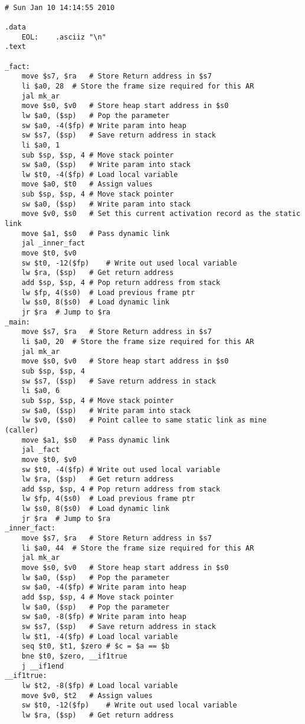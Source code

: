 \begin{lstlisting}[showstringspaces=false,breaklines=true,backgroundcolor=\color{light-gray}, captionpos=b]
         
# Sun Jan 10 14:14:55 2010

.data
	EOL:	.asciiz "\n"
.text

_fact:
	move $s7, $ra	# Store Return address in $s7
	li $a0, 28	# Store the frame size required for this AR
	jal mk_ar
	move $s0, $v0	# Store heap start address in $s0
	lw $a0, ($sp)	# Pop the parameter
	sw $a0, -4($fp)	# Write param into heap
	sw $s7, ($sp)	# Save return address in stack
	li $a0, 1
	sub $sp, $sp, 4	# Move stack pointer
	sw $a0, ($sp)	# Write param into stack
	lw $t0, -4($fp)	# Load local variable
	move $a0, $t0	# Assign values
	sub $sp, $sp, 4	# Move stack pointer
	sw $a0, ($sp)	# Write param into stack
	move $v0, $s0	# Set this current activation record as the static link
	move $a1, $s0	# Pass dynamic link
	jal _inner_fact
	move $t0, $v0
	sw $t0, -12($fp)	# Write out used local variable
	lw $ra, ($sp)	# Get return address
	add $sp, $sp, 4	# Pop return address from stack
	lw $fp, 4($s0)	# Load previous frame ptr
	lw $s0, 8($s0)	# Load dynamic link
	jr $ra	# Jump to $ra
_main:
	move $s7, $ra	# Store Return address in $s7
	li $a0, 20	# Store the frame size required for this AR
	jal mk_ar
	move $s0, $v0	# Store heap start address in $s0
	sub $sp, $sp, 4
	sw $s7, ($sp)	# Save return address in stack
	li $a0, 6
	sub $sp, $sp, 4	# Move stack pointer
	sw $a0, ($sp)	# Write param into stack
	lw $v0, ($s0)	# Point callee to same static link as mine (caller)
	move $a1, $s0	# Pass dynamic link
	jal _fact
	move $t0, $v0
	sw $t0, -4($fp)	# Write out used local variable
	lw $ra, ($sp)	# Get return address
	add $sp, $sp, 4	# Pop return address from stack
	lw $fp, 4($s0)	# Load previous frame ptr
	lw $s0, 8($s0)	# Load dynamic link
	jr $ra	# Jump to $ra
_inner_fact:
	move $s7, $ra	# Store Return address in $s7
	li $a0, 44	# Store the frame size required for this AR
	jal mk_ar
	move $s0, $v0	# Store heap start address in $s0
	lw $a0, ($sp)	# Pop the parameter
	sw $a0, -4($fp)	# Write param into heap
	add $sp, $sp, 4	# Move stack pointer
	lw $a0, ($sp)	# Pop the parameter
	sw $a0, -8($fp)	# Write param into heap
	sw $s7, ($sp)	# Save return address in stack
	lw $t1, -4($fp)	# Load local variable
	seq $t0, $t1, $zero	# $c = $a == $b
	bne $t0, $zero, __if1true
	j __if1end
__if1true:
	lw $t2, -8($fp)	# Load local variable
	move $v0, $t2	# Assign values
	sw $t0, -12($fp)	# Write out used local variable
	lw $ra, ($sp)	# Get return address

\end{lstlisting}
